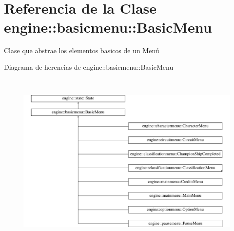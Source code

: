 \hypertarget{classengine_1_1basicmenu_1_1BasicMenu}{
\section{\-Referencia de la \-Clase engine\-:\-:basicmenu\-:\-:\-Basic\-Menu}
\label{classengine_1_1basicmenu_1_1BasicMenu}
}


\-Clase que abstrae los elementos basicos de un \-Menú  


\-Diagrama de herencias de engine\-:\-:basicmenu\-:\-:\-Basic\-Menu\begin{figure}[H]
\begin{center}
\leavevmode
\includegraphics[height=8.945687cm]{classengine_1_1basicmenu_1_1BasicMenu}
\end{center}
\end{figure}
